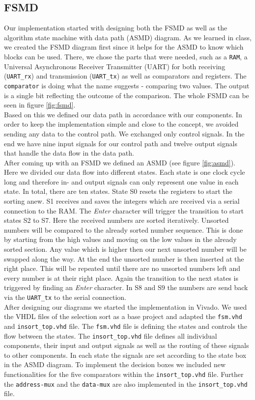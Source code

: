 \documentclass[conference]{IEEEtran}
\begin{document}
\subsection{FSMD}\label{sec:fsmd}
Our implementation started with designing both the FSMD as well as the algorithm state machine with data path (ASMD) diagram. As we learned in class, we created the FSMD diagram first since it helps for the ASMD to know which blocks can be used. There, we chose the parts that were needed, such as a \texttt{RAM}, a Universal Asynchronous Receiver Transmitter (UART) for both receiving (\texttt{UART\_rx}) and transmission (\texttt{UART\_tx}) as well as comparators and registers. The \texttt{comparator} is doing what the name suggests - comparing two values. The output is a single bit reflecting the outcome of the comparison. The whole FSMD can be seen in figure \ref{fig:fsmd}.\\ 
Based on this we defined our data path in accordance with our components. In order to keep the implementation simple and close to the concept, we avoided sending any data to the control path. We exchanged only control signals. In the end we have nine input signals for our control path and twelve output signals that handle the data flow in the data path.\\
After coming up with an FSMD we defined an ASMD (see figure \ref{fig:asmd}). Here we divided our data flow into different states. Each state is one clock cycle long and therefore in- and output signals can only represent one value in each state. In total, there are ten states. State S0 resets the registers to start the sorting anew. S1 receives and saves the integers which are received via a serial connection to the RAM. The \textit{Enter} character will trigger the transition to start states S2 to S7. Here the received numbers are sorted iteratively. Unsorted numbers will be compared to the already sorted number sequence. This is done by starting from the high values and moving on the low values in the already sorted section. Any value which is higher then our next unsorted number will be swapped along the way. At the end the unsorted number is then inserted at the right place. This will be repeated until there are no unsorted numbers left and every number is at their right place. Again the transition to the next states is triggered by finding an \textit{Enter} character. In S8 and S9 the numbers are send back via the \texttt{UART\_tx} to the serial connection. \\
After designing our diagrams we started the implementation in Vivado. We used the VHDL files of the selection sort as a base project and adapted the \texttt{fsm.vhd} and \texttt{insort\_top.vhd} file. The \texttt{fsm.vhd} file is defining the states and controls the flow between the states. The \texttt{insort\_top.vhd} file defines all individual components, their input and output signals as well as the routing of these signals to other components. In each state the signals are set according to the state box in the ASMD diagram. To implement the decision boxes we included new functionalities for the five comparators within the \texttt{insort\_top.vhd} file. Further the \texttt{address-mux} and the \texttt{data-mux} are also implemented in the \texttt{insort\_top.vhd} file.\\
\end{document}
